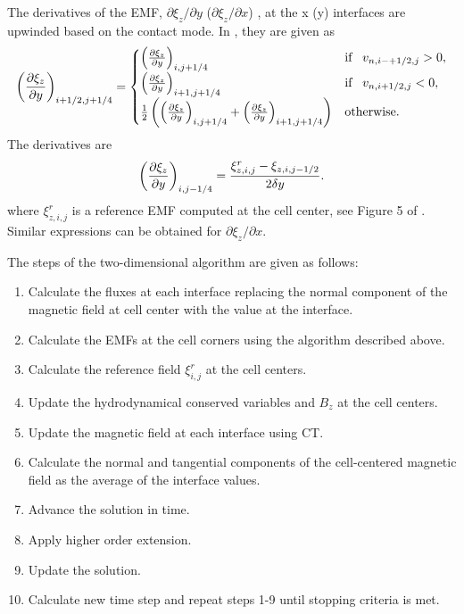 The derivatives of the EMF, $\partial \xi_z / \partial y$ ($\partial \xi_z / \partial x$) , at the x (y) interfaces are upwinded based on the contact mode.  In \citep{Gardiner:2005}, they are given as
\begin{gather}
\label{eqn:emf_upwind}
\left( \frac{\partial \xi_z}{\partial y}\right)_{i+1/2,j+1/4} =
\begin{cases}
\left( \frac{\partial \xi_z}{\partial y}\right)_{i,j+1/4} & \text{if}\;\;\; v_{n,i-+1/2,j} > 0 , \\
\left( \frac{\partial \xi_z}{\partial y}\right)_{i+1,j+1/4} & \text{if}\;\;\; v_{n,i+1/2,j} < 0 , \\
\frac{1}{2}\left(\left( \frac{\partial \xi_z}{\partial y}\right)_{i,j+1/4} + \left( \frac{\partial \xi_z}{\partial y}\right)_{i+1,j+1/4} \right)& \text{otherwise}.
\end{cases}
\end{gather}
The derivatives are 
\begin{gather}
\left( \frac{\partial \xi_z}{\partial y} \right)_{i,j-1/4} = \frac{\xi^r_{z,i,j} - \xi_{z,i,j-1/2}}{2\delta y}.
\end{gather}
where $\xi^r_{z,i,j}$ is a reference EMF computed at the cell center, see Figure 5 of \citep{Stone:2008}.  Similar expressions can be obtained for $\partial \xi_z / \partial x$. 

The steps of the two-dimensional algorithm are given as follows:
\begin{enumerate}
\item Calculate the fluxes at each interface replacing the normal component of the magnetic field at cell center with the value at the interface.
\item Calculate the EMFs at the cell corners using the algorithm described above.
\item Calculate the reference field $\xi^r_{i,j}$ at the cell centers.
\item Update the hydrodynamical conserved variables and $B_z$ at the cell centers.
\item Update the magnetic field at each interface using CT.
\item Calculate the normal and tangential components of the cell-centered magnetic field as the average of the interface values.
\item Advance the solution in time.
\item Apply higher order extension.
\item Update the solution.
\item Calculate new time step and repeat steps 1-9 until stopping criteria is met.
\end{enumerate}

